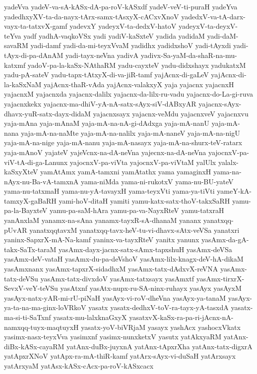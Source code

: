 {yadeVva
yadeV-va-sA-kASx-dA-pa-roV-kASxdf
yadeV-veV-ti-puraH
yadeYva
yadedhxyXV-ta-da-nayx-tArx-samx-tAsxyX-cACxvXnoV
yadedxV-va-tA-darx-vayx-ta-tatxvX-gamf
yadevxY
yadeyxV-ta-dedxV-hatoV
yadeyxV-ta-deyxV-teYva
yadf
yadhA-vaqkoVSx
yadi
yadiV-kaSxteV
yadida
yadidaM
yadi-daM-savaRM
yadi-damf
yadi-da-mi-teyxVvaM
yadidhx
yadidxshoV
yadi-tAyxdi
yadi-tAyx-di-pa-dAnAM
yadi-tayx-neVna
yadivA
yadivx-Sa-yaM-da-shaR-na-mu-katxmf
yadoV-pa-la-kaSx-NAthaRM
yadu-cayxteV
yadu-didxshayx
yadukatxM
yadu-pA-sateV
yadu-tapx-tAtxyX-di-va-jiR-tamf
yajAcnx-di-gaLeV
yajAcnx-di-la-kaSxNaM
yajAcnx-thaR-vAda
yajAcnx-valakxyX
yaja
yajacnx
yajacnxH
yajacnxM
yajacnxda
yajacnx-dalilx
yajacnx-da-lilx-ru-vadu
yajacnx-do-La-gi-ruva
yajacnxkekx
yajacnx-ma-dhiV-yA-nA-satx-sAyx-siV-dABxyAR
yajacnx-sAyx-dhavx-yuR-satx-dayx-didaM
yajacnxsayx
yajacnx-veMdu
yajacnxveV
yajacnxvu
yaja-mAna
yaja-mAnaM
yaja-mA-na-nA-gi-dAdxga
yaja-mA-nanU
yaja-mA-nana
yaja-mA-na-naMte
yaja-mA-na-nalilx
yaja-mA-naneV
yaja-mA-na-nigU
yaja-mA-na-nige
yaja-mA-nanu
yaja-mA-nasayx
yaja-mA-na-shurx-teV-ratarx
yaja-mAnoV
yajateV
yajeVcnx-na-dA-neVna
yajecnx-na-dA-neVna
yajocnxV-pa-viV-tA-di-ga-Lanunx
yajocnxV-pa-viVta
yajocnxV-pa-viVtaM
yalUlx
yalalx-kaSxyXteV
yamAtAmx
yamA-tamxni
yamAtathx
yama
yamaginxH
yama-na-nAyx-nu-Ba-vA-tamxnA
yama-niMda
yama-ni-rukotxV
yama-nu-BU-yateV
yama-nu-tatxmaH
yama-nu-yA-tavayxH
yama-teyxVti
yama-ya-tiVti
yameY-kA-tamxyX-gaBaRH
yami-hoV-ditaH
yamiti
yamu-katx-satx-thoV-takxSaRH
yamu-pa-la-BayxteV
yamu-pa-saM-hAra
yamu-pa-va-NayxRteV
yamu-tatxraH
yanAnxlaM
yanamx-na-sAna
yanamx-tayxR-sA-dhanaM
yananx
yanatxqq-pUvAR
yanatxqqtavxM
yanatxqq-tavx-heV-tu-vi-dhavx-sAtx-veVSa
yanatxri
yaninx-SapxrX-mA-Na-kamf
yaninx-va-tayxRteV
yanitx
yanunx
yasAmx-da-gA-takx-SaTx-taraM
yasAmx-dayx-jacnx-satx-sAmx-tapxshuH
yasAmx-deVSa
yasAmx-deV-vataH
yasAmx-du-pa-deVshoV
yasAmx-lilx-knagx-deV-hA-dikaM
yasAmxnanx
yasAmx-tapxrX-sidadhxM
yasAmx-tatx-dAdxvX-reVNA
yasAmx-tatx-deVSu
yasAmx-tatx-divxdoV
yasAmx-tatxsayx
yasAmxtf
yasAmx-tirxrX-SevxV-veY-teVSu
yasAtxnf
yasAtx-nupx-ru-SA-ninx-ruhayx
yasAyx
yasAyxM
yasAyx-natx-yAR-mi-rU-piNaH
yasAyx-vi-roV-dheVna
yasAyx-ya-tanaM
yasAyx-ya-ta-na-ma-ginx-loVRkoV
yasatx
yasatx-dedhxV-toV-ra-tayx-yA-tasxdA
yasatx-ma-si-ti-SaTxnf
yasatx-mu-lalxknaGxyX
yasatxvX-kaSx-ra-pa-ri-jAcnx-nA-namxqq-tuyx-maqtuyxH
yasatx-yoV-biVRjaM
yasayx
yashAcx
yashocxVkatx
yasimx-nasx-teyxVva
yasimxnf
yasimx-nunxketxV
yasutx
yatAkxyaRM
yatAnx-diBx-kASx-cayaRM
yatAnx-duBx-juyxnA
yatAnx-tApxrXha
yatAnx-tatx-digxrA
yatApxrXNoV
yatApx-ra-mA-thiR-kamf
yatArx-sAyx-vi-duSaH
yatArxsayx
yatArxyaM
yatAsx-kASx-cAcx-pa-roV-kASxcacx
}
